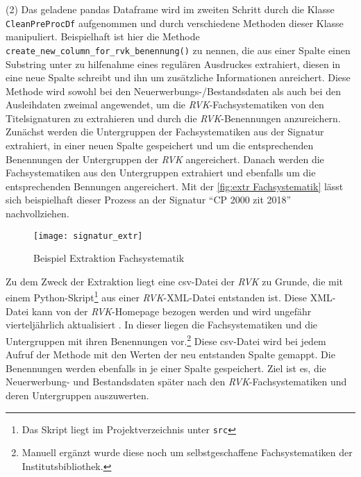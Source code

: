     (2) Das geladene pandas Dataframe wird im zweiten Schritt durch die Klasse \texttt{CleanPreProcDf} aufgenommen und durch verschiedene Methoden dieser Klasse
    manipuliert. Beispielhaft ist hier die Methode \texttt{create\_new\_column\_for\_rvk\_benennung()} zu nennen, die aus einer Spalte einen Substring unter
    zu hilfenahme eines regulären Ausdruckes extrahiert, diesen in eine neue Spalte schreibt und ihn um zusätzliche Informationen anreichert. 
    Diese Methode wird sowohl bei den Neuerwerbungs-/Bestandsdaten als auch bei den Ausleihdaten zweimal angewendet, um die \textit{\acrshort{RVK}}-Fachsystematiken von den
    Titelsignaturen zu extrahieren und durch die \textit{\acrshort{RVK}}-Benennungen anzureichern. 
    Zunächst werden die Untergruppen der Fachsystematiken aus der Signatur extrahiert, in einer neuen Spalte gespeichert und um die entsprechenden Benennungen der Untergruppen der 
    \textit{\acrshort{RVK}} angereichert. 
    Danach werden die Fachsystematiken aus den Untergruppen extrahiert und ebenfalls um die entsprechenden Bennungen angereichert.
    Mit der \autoref{fig:extr Fachsystematik} lässt sich beispielhaft dieser Prozess an der Signatur \enquote{CP 2000 zit 2018} nachvollziehen.
    \begin{figure}[H]
        \centering
            \texttt{[image: signatur\_extr]}
            \caption{Beispiel Extraktion Fachsystematik}
            \label{fig:extr Fachsystematik}
    \end{figure}

    Zu dem Zweck der Extraktion liegt eine csv-Datei der \textit{\acrshort{RVK}} zu Grunde, die mit einem Python-Skript\footnote{Das Skript liegt im Projektverzeichnis
    unter \texttt{src}} aus einer \textit{\acrshort{RVK}}-XML-Datei entstanden ist.
    Diese XML-Datei kann von der \textit{\acrshort{RVK}}-Homepage bezogen werden und wird ungefähr vierteljährlich aktualisiert \cite[vgl.][]{rvk_rvk_2021}.
    In dieser liegen die Fachsystematiken und die Untergruppen mit ihren Benennungen vor.\footnote{Manuell ergänzt wurde diese noch um selbstgeschaffene Fachsystematiken der Institutsbibliothek.}
    Diese csv-Datei wird bei jedem Aufruf der Methode mit den Werten der neu entstanden Spalte gemappt. Die Benennungen werden ebenfalls in je einer Spalte gespeichert.
    Ziel ist es, die Neuerwerbung- und Bestandsdaten später nach den \textit{\acrshort{RVK}}-Fachsystematiken und deren Untergruppen auszuwerten.
    
